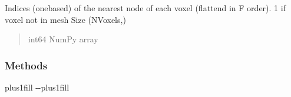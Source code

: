 \documentclass[letterpaper,10pt,english]{sphinxmanual}
\begin{document}
\begin{fulllineitems}
\begin{fulllineitems}
\begin{quote}
\begin{description}
\end{description}\end{quote}

\end{fulllineitems}


\begin{fulllineitems}
\label{\detokenize{_autosummary/nirfasterff.base.data.meshvol:nirfasterff.base.data.meshvol.nn}}
\pysigstartsignatures
\pysigline
{}
\pysigstopsignatures
\sphinxAtStartPar
Indices (one\sphinxhyphen{}based) of the nearest node of each voxel (flattend in F order). \sphinxhyphen{}1 if voxel not in mesh
Size (NVoxels,)
\begin{quote}\begin{description}
\sphinxAtStartPar
int64 NumPy array

\end{description}\end{quote}

\end{fulllineitems}


\begin{fulllineitems}
\label{\detokenize{_autosummary/nirfasterff.base.data.meshvol:nirfasterff.base.data.meshvol.__init__}}
\pysigstartsignatures
\pysiglinewithargsret
{}
{}
{}
\pysigstopsignatures
\end{fulllineitems}

\subsubsection*{Methods}


\begin{savenotes}
\sphinxatlongtablestart
\sphinxthistablewithglobalstyle
\sphinxthistablewithnovlinesstyle
\makeatletter
  \LTleft \@totalleftmargin plus1fill
  \LTright\dimexpr\columnwidth-\@totalleftmargin-\linewidth\relax plus1fill
\makeatother
\begin{longtable}{}
\sphinxtoprule
\endfirsthead

\\
\sphinxtoprule
\endhead


\end{longtable}
\end{savenotes}
\end{fulllineitems}
\end{document}
